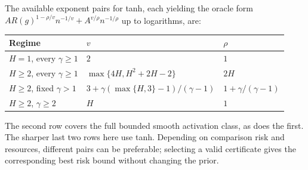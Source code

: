 The available exponent pairs for tanh, each yielding the oracle form
$A R(g)^{1-\rho/v}n^{-1/v}+A^{v/\rho}n^{-1/\rho}$ up to logarithms, are:
\begin{center}
\begin{tabular}{lll}
\toprule
Regime & $v$ & $\rho$\\
\midrule
$H=1$, every $\gamma\ge1$ & $2$ & $1$\\
$H\ge2$, every $\gamma\ge1$ & $\max\{4H,H^2+2H-2\}$ & $2H$\\
$H\ge2$, fixed $\gamma>1$ & $3+\gamma(\max\{H,3\}-1)/(\gamma-1)$ & $1+\gamma/(\gamma-1)$\\
$H\ge2$, $\gamma\ge2$ & $H$ & $1$\\
\bottomrule
\end{tabular}
\end{center}
The second row covers the full bounded smooth activation class, as does the first. The sharper last two rows here use tanh. Depending on comparison risk and resources, different pairs can be preferable; selecting a valid certificate gives the corresponding best risk bound without changing the prior.
